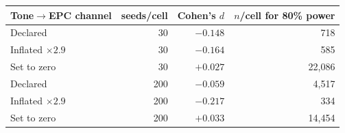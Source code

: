\begin{tabular}{lrrr}
\toprule
Tone$\to$EPC channel & seeds/cell & Cohen's $d$ & $n$/cell for 80\% power \\
\midrule
Declared & 30 & $-0.148$ & 718 \\
Inflated $\times 2.9$ & 30 & $-0.164$ & 585 \\
Set to zero & 30 & $+0.027$ & 22,086 \\
\midrule
Declared & 200 & $-0.059$ & 4,517 \\
Inflated $\times 2.9$ & 200 & $-0.217$ & 334 \\
Set to zero & 200 & $+0.033$ & 14,454 \\
\bottomrule
\end{tabular}
